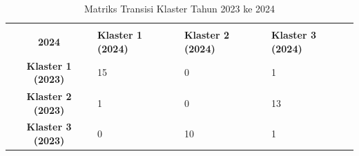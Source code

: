 \begin{table}[H]
\centering
\caption{Matriks Transisi Klaster Tahun 2023 ke 2024} \label{tab:transisi_2023_2024}
\begin{tabular}{|c|p{2cm}|p{2cm}|p{2cm}|}
\hline
\makecell{\textbf{Tahun 2023} \\ \textbf{2024}} & \textbf{Klaster 1 (2024)} & \textbf{Klaster 2 (2024)} & \textbf{Klaster 3 (2024)} \\ \hline
\textbf{Klaster 1 (2023)} & 15 & 0 & 1 \\ \hline
\textbf{Klaster 2 (2023)} & 1 & 0 & 13 \\ \hline
\textbf{Klaster 3 (2023)} & 0 & 10 & 1 \\ \hline
\end{tabular}
\end{table}